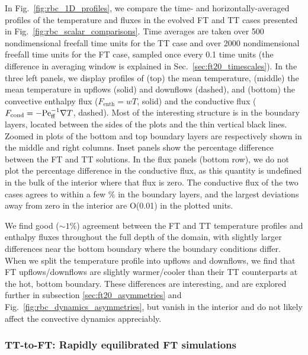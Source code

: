 In Fig.~\ref{fig:rbc_1D_profiles}, we compare the time- and horizontally-averaged profiles of the temperature and fluxes in the evolved FT and TT cases presented in Fig.~\ref{fig:rbc_scalar_comparisons}.
Time averages are taken over 500 nondimensional freefall time units for the TT case and over 2000 nondimensional freefall time units for the FT case, sampled once every 0.1 time units (the difference in averaging window is explained in Sec.~\ref{sec:ft20_timescales}).
In the three left panels, we display profiles of (top) the mean temperature, (middle) the mean temperature in upflows (solid) and downflows (dashed), and (bottom) the convective enthalpy flux ($F_{\text{enth}} = wT$, solid) and the conductive flux ($F_{\text{cond}} = -\text{Pe}_{\text{ff}}^{-1}\nabla T$, dashed).
Most of the interesting structure is in the boundary layers, located between the sides of the plots and the thin vertical black lines.
Zoomed in plots of the bottom and top boundary layers are respectively shown in the middle and right columns.
Inset panels show the percentage difference between the FT and TT solutions.
In the flux panels (bottom row), we do not plot the percentage difference in the conductive flux, as this quantity is undefined in the bulk of the interior where that flux is zero.
The conductive flux of the two cases agrees to within a few \% in the boundary layers, and the largest deviations away from zero in the interior are O(0.01) in the plotted units. 

We find good ($\sim 1\%$) agreement between the FT and TT temperature profiles and enthalpy fluxes throughout the full depth of the domain, with slightly larger differences near the bottom boundary where the boundary conditions differ.
When we split the temperature profile into upflows and downflows, we find that FT upflows/downflows are slightly warmer/cooler than their TT counterparts at the hot, bottom boundary.
These differences are interesting, and are explored further in subsection \ref{sec:ft20_asymmetries} and Fig.~\ref{fig:rbc_dynamics_asymmetries}, but vanish in the interior and do not likely affect the convective dynamics appreciably.

\subsubsection{TT-to-FT: Rapidly equilibrated FT simulations}
\label{sec:ft20_tt-to-ft}

